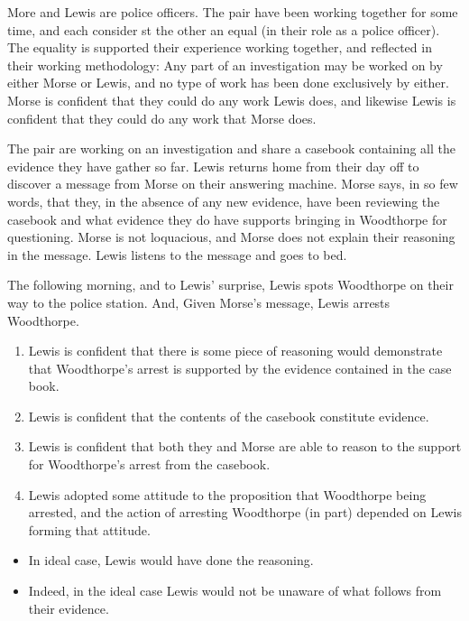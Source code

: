 \documentclass[10pt]{article}
\begin{document}
\begin{scenario}
  More and Lewis are police officers.
  The pair have been working together for some time, and each consider st the other an equal (in their role as a police officer).
  The equality is supported their experience working together, and reflected in their working methodology:
  Any part of an investigation may be worked on by either Morse or Lewis, and no type of work has been done exclusively by either.
  Morse is confident that they could do any work Lewis does, and likewise Lewis is confident that they could do any work that Morse does.

  The pair are working on an investigation and share a casebook containing all the evidence they have gather so far.
  Lewis returns home from their day off to discover a message from Morse on their answering machine.
  Morse says, in so few words, that they, in the absence of any new evidence, have been reviewing the casebook and what evidence they do have supports bringing in Woodthorpe for questioning.
  Morse is not loquacious, and Morse does not explain their reasoning in the message.
  Lewis listens to the message and goes to bed.

  The following morning, and to Lewis' surprise, Lewis spots Woodthorpe on their way to the police station.
  And, Given Morse's message, Lewis arrests Woodthorpe.
\end{scenario}

\begin{enumerate}
\item Lewis is confident that there is some piece of reasoning would demonstrate that Woodthorpe's arrest is supported by the evidence contained in the case book.
\item Lewis is confident that the contents of the casebook constitute evidence.
\item Lewis is confident that both they and Morse are able to reason to the support for Woodthorpe's arrest from the casebook.
\item Lewis adopted some attitude to the proposition that Woodthorpe being arrested, and the action of arresting Woodthorpe (in part) depended on Lewis forming that attitude.
\end{enumerate}

\begin{itemize}
\item In ideal case, Lewis would have done the reasoning.
\item Indeed, in the ideal case Lewis would not be unaware of what follows from their evidence.
\end{itemize}
\end{document}
